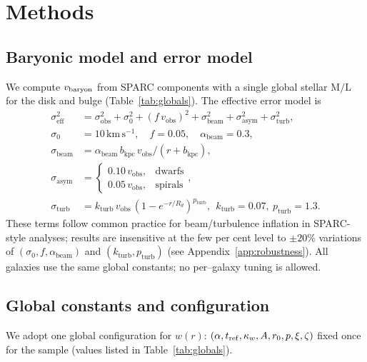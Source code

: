 \documentclass[twocolumn,prd,amsmath,amssymb,aps,superscriptaddress,nofootinbib]{revtex4-2}
\begin{document}
\section{Methods}
\subsection{Baryonic model and error model}
We compute $v_{\rm baryon}$ from SPARC components with a single global stellar $\mathrm{M/L}$ for the disk and bulge (Table~\ref{tab:globals}). The effective error model is
\begin{align}
  \sigma_\mathrm{eff}^2 &= \sigma_\mathrm{obs}^2 + \sigma_0^2 + (f\,v_\mathrm{obs})^2 + \sigma_\mathrm{beam}^2 + \sigma_\mathrm{asym}^2 + \sigma_\mathrm{turb}^2,\\
  \sigma_0 &= 10\,\mathrm{km\,s^{-1}},\quad f = 0.05,\quad \alpha_\mathrm{beam}=0.3,\\
  \sigma_\mathrm{beam} &= \alpha_\mathrm{beam}\, b_\mathrm{kpc}\, v_\mathrm{obs}/(r+b_\mathrm{kpc}),\\
  \sigma_\mathrm{asym} &= \begin{cases}0.10\,v_\mathrm{obs}, & \text{dwarfs}\\ 0.05\,v_\mathrm{obs}, & \text{spirals}\end{cases},\\
  \sigma_\mathrm{turb} &= k_\mathrm{turb}\, v_\mathrm{obs}\,(1-e^{-r/R_d})^{p_\mathrm{turb}},\ \ k_\mathrm{turb}=0.07,\ p_\mathrm{turb}=1.3.
\end{align}
These terms follow common practice for beam/turbulence inflation in SPARC-style analyses; results are insensitive at the few per cent level to $\pm 20\%$ variations of $(\sigma_0, f, \alpha_\mathrm{beam})$ and $(k_\mathrm{turb}, p_\mathrm{turb})$ (see Appendix~\ref{app:robustness}). All galaxies use the same global constants; no per–galaxy tuning is allowed.

\subsection{Global constants and configuration}
We adopt one global configuration for $w(r)$: $(\alpha,t_{\rm ref},\kappa_{w},A,r_0,p,\xi,\zeta)$ fixed once for the sample (values listed in Table~\ref{tab:globals}).
\end{document}
